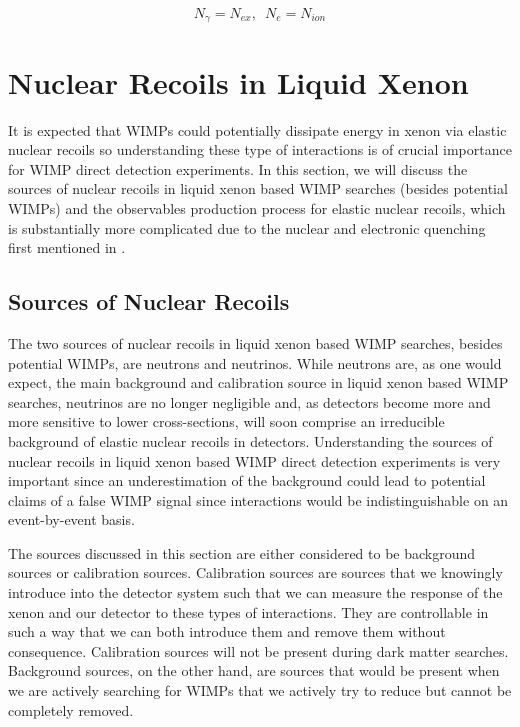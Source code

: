 \begin{equation}
        \label{eqn:er_observables}
        N_{\gamma} = N_{ex}, \, \, \, N_e = N_{ion}
\end{equation}

\section{Nuclear Recoils in Liquid Xenon}
\label{sec:lxe_nr}

It is expected that WIMPs could potentially dissipate energy in xenon via elastic nuclear recoils so understanding these type of interactions is of crucial importance for WIMP direct detection experiments.  In this section, we will discuss the sources of nuclear recoils in liquid xenon based WIMP searches (besides potential WIMPs) and the observables production process for elastic nuclear recoils, which is substantially more complicated due to the nuclear and electronic quenching first mentioned in .



\subsection{Sources of Nuclear Recoils}

The two sources of nuclear recoils in liquid xenon based WIMP searches, besides potential WIMPs, are neutrons and neutrinos.   While neutrons are, as one would expect, the main background and calibration source in liquid xenon based WIMP searches, neutrinos are no longer negligible and, as detectors become more and more sensitive to lower cross-sections, will soon comprise an irreducible background of elastic nuclear recoils in detectors.  Understanding the sources of nuclear recoils in liquid xenon based WIMP direct detection experiments is very important since an underestimation of the background could lead to potential claims of a false WIMP signal since interactions would be indistinguishable on an event-by-event basis.

The sources discussed in this section are either considered to be background sources or calibration sources.  Calibration sources are sources that we knowingly introduce into the detector system such that we can measure the response of the xenon and our detector to these types of interactions.  They are controllable in such a way that we can both introduce them and remove them without consequence.  Calibration sources will not be present during dark matter searches.  Background sources, on the other hand, are sources that would be present when we are actively searching for WIMPs that we actively try to reduce but cannot be completely removed.

